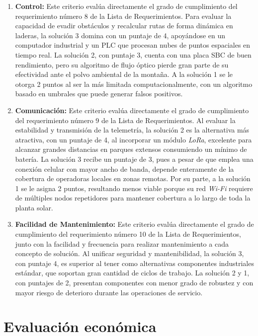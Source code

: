 \begin{enumerate}
	\item \textbf{Control:}  Este criterio evalúa directamente el grado de cumplimiento del requerimiento número 8 de la Lista de Requerimientos.
	Para evaluar la capacidad de evadir obstáculos y recalcular rutas de forma dinámica en laderas, la solución 3 domina con un puntaje de 4, apoyándose en un computador industrial y un PLC que procesan nubes de puntos espaciales en tiempo real. La solución 2, con puntaje 3, cuenta con una placa SBC de buen rendimiento, pero su algoritmo de flujo óptico pierde gran parte de su efectividad ante el polvo ambiental de la montaña. A la solución 1 se le otorga 2 puntos al ser la más limitada computacionalmente, con un algoritmo basado en umbrales que puede generar falsos positivos.
	
	\item \textbf{Comunicación:} Este criterio evalúa directamente el grado de cumplimiento del requerimiento número 9 de la Lista de Requerimientos.
	Al evaluar la estabilidad y transmisión de la telemetría, la solución 2 es la alternativa más atractiva, con un puntaje de 4, al incorporar un módulo \textit{LoRa}, excelente para alcanzar grandes distancias en parques extensos consumiendo un mínimo de batería. La solución 3 recibe un puntaje de 3, pues a pesar de que emplea una conexión celular con mayor ancho de banda, depende enteramente de la cobertura de operadoras locales en zonas remotas. Por su parte, a la solución 1 se le asigna 2 puntos, resultando menos viable porque su red \textit{Wi-Fi} requiere de múltiples nodos repetidores para mantener cobertura a lo largo de toda la planta solar.
	
	\item \textbf{Facilidad de Mantenimiento:} Este criterio evalúa directamente el grado de cumplimiento del requerimiento número 10 de la Lista de Requerimientos, junto con la facilidad y frecuencia para realizar mantenimiento a cada concepto de solución.
	Al unificar seguridad y mantenibilidad, la solución 3, con puntaje 4, es superior al tener como alternativas componentes industriales estándar, que soportan gran cantidad de ciclos de trabajo. La solución 2 y 1, con puntajes de 2, presentan componentes con menor grado de robustez y con mayor riesgo de deterioro durante las operaciones de servicio.
\end{enumerate}

\section{Evaluación económica}

